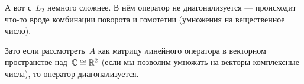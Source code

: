 \begin{solution}
	А вот с~$L_2$ немного сложнее. В нём оператор не диагонализуется --- происходит что-то вроде комбинации поворота и гомотетии (умножения на вещественное число).

	Зато если рассмотреть~$A$ как матрицу линейного оператора в векторном пространстве над~$\mathbb{C} \cong \mathbb{R}^2$ (если мы позволим умножать на векторы комплексные числа), то оператор диагонализуется.
\end{solution}

